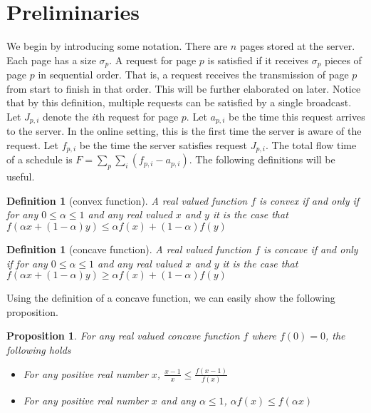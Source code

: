 \documentclass[11pt]{article}
\newtheorem{definition}[lemma]{Definition}
\newtheorem{proposition}[lemma]{Proposition}
\begin{document}
\section{Preliminaries}



We begin by introducing some notation.  There are $n$ pages stored at the server.  Each page has a size $\sigma_p$.   A request for page $p$ is satisfied if it receives $\sigma_p$ pieces of page $p$ in sequential order.  That is, a request receives the transmission of page $p$ from start to finish in that order. This will be further elaborated on later.   Notice that by this definition, multiple requests can be satisfied by a single broadcast. Let $J_{p,i}$ denote the $i$th request for page $p$. Let $a_{p,i}$ be the time this request arrives to the server.  In the online setting, this is the first time the server is aware of the request. Let $f_{p,i}$ be the time the server satisfies request $J_{p,i}$. The total flow time of a schedule is $F= \sum_p \sum_i (f_{p,i} - a_{p,i})$.  The following definitions will be useful.

\begin{definition}[convex function]
A real valued function $f$ is convex if and only if for any $0  \leq \alpha \leq 1$ and any real valued $x$ and $y$ it is the case that $f(\alpha x + (1-\alpha)y) \leq \alpha f(x) + (1- \alpha)f(y)$ 
\end{definition}

\begin{definition}[concave function]
A real valued function $f$ is concave if and only if for any $0  \leq \alpha \leq 1$ and any real valued $x$ and $y$ it is the case that $f(\alpha x + (1-\alpha)y) \geq \alpha f(x) + (1- \alpha)f(y)$ 
\end{definition}

Using the definition of a concave function, we can easily show the following proposition.

\begin{proposition}
\label{prop:one}
For any real valued concave function $f$ where $f(0)=0$, the following holds
\begin{itemize}
\item For any positive real number $x$, $\frac{x-1}{x} \leq \frac{f(x-1)}{f(x)}$

\item  For any positive real number $x$ and any $\alpha \leq 1$, $\alpha f(x) \leq f(\alpha x)$

\end{itemize}
\end{proposition}
\end{document}
